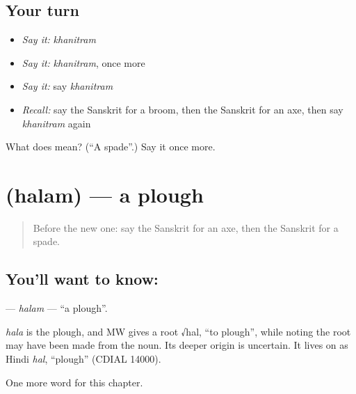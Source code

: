 \subsection*{Your turn}
\begin{itemize}
\raggedright
  \item \emph{Say it:} \emph{khanitram}
  \item \emph{Say it:} \emph{khanitram}, once more
  \item \emph{Say it:} say \emph{khanitram}
  \item \emph{Recall:} say the Sanskrit for a broom, then the Sanskrit for an axe, then say \emph{khanitram} again
\end{itemize}

\begin{tcolorbox}[breakable,colback=teal!4,colframe=teal!35!black,title={Before you move on}]
What does  mean? (\textquotedblleft{}A spade\textquotedblright{}.) Say it once more.
\end{tcolorbox}
\section[\texorpdfstring{\sk{हलम्} (halam)}{हलम् (halam)}]{ (halam) — a plough}

\label{lesson:SA-C218-halam}



\begin{quote}
Before the new one: say the Sanskrit for an axe, then the Sanskrit for a spade.
\end{quote}

\subsection*{You'll want to know: }
\textbf{} — \emph{halam} — \textquotedblleft{}a plough\textquotedblright{}.

\begin{cousinweb}
\emph{hala} is the plough, and MW gives a root √hal, \textquotedblleft{}to plough\textquotedblright{}, while noting the root may have been made from the noun. Its deeper origin is uncertain. It lives on as Hindi \emph{hal}, \textquotedblleft{}plough\textquotedblright{} (CDIAL 14000).
\end{cousinweb}

\begin{grammarlens}[title={What you've built}]
One more word for this chapter.
\end{grammarlens}


